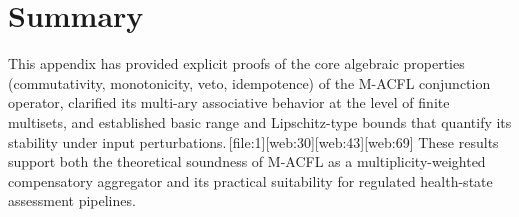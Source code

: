 \documentclass[11pt]{article}
\begin{document}
\section{Summary}

This appendix has provided explicit proofs of the core algebraic properties (commutativity, monotonicity, veto, idempotence) of the M-ACFL conjunction operator, clarified its multi-ary associative behavior at the level of finite multisets, and established basic range and Lipschitz-type bounds that quantify its stability under input perturbations.\,[file:1][web:30][web:43][web:69] 
These results support both the theoretical soundness of M-ACFL as a multiplicity-weighted compensatory aggregator and its practical suitability for regulated health-state assessment pipelines.

\nocite{*}
  
  
\end{document}

